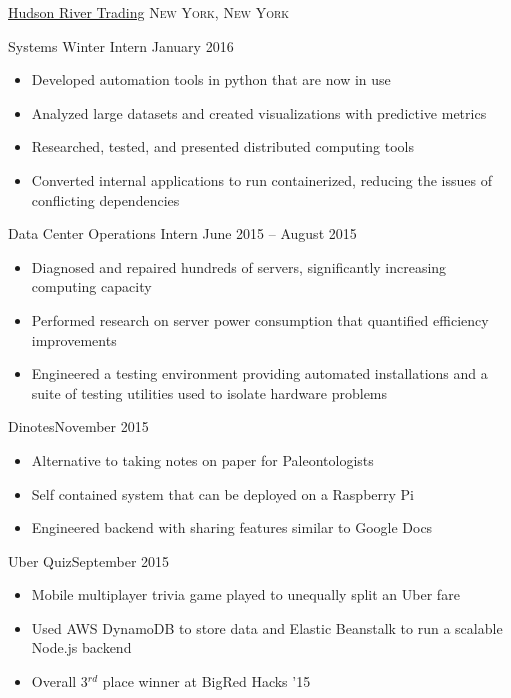 \documentclass[11pt]{article}
\begin{document}
\headedsection  %
{\href{http://www.hudson-trading.com/}{Hudson River Trading}}
{\textsc{New York, New York}} {
    \headedsubsection
    {Systems Winter Intern}
    {January 2016}
    {
        \begin{itemize}
            \item Developed automation tools in python that are now in use
            \item Analyzed large datasets and created visualizations with predictive metrics
            \item Researched, tested, and presented distributed computing tools
            \item Converted internal applications to run containerized, reducing the issues of conflicting dependencies
        \end{itemize}
    }
}

\headedsection  %
{}
{} {
    \headedsubsection
    {Data Center Operations Intern}
    {June 2015 -- August 2015}
    {
        \begin{itemize}
            \item Diagnosed and repaired hundreds of servers, significantly increasing computing capacity
            \item Performed research on server power consumption that quantified efficiency improvements
            \item Engineered a testing environment providing automated installations and a suite of testing utilities used to isolate hardware problems
        \end{itemize}
    }
}


\spacedhrule{0.1em}{0.9em}  %

\headedsubsection
{Dinotes}{November 2015}
{
    \begin{itemize}[leftmargin=0.5in]
        \item{Alternative to taking notes on paper for Paleontologists}
        \item{Self contained system that can be deployed on a Raspberry Pi}
        \item{Engineered backend with sharing features similar to Google Docs}
    \end{itemize}
}

\headedsubsection
{Uber Quiz}{September 2015}
{
    \begin{itemize}[leftmargin=0.5in]
        \item{Mobile multiplayer trivia game played to unequally split an Uber fare}
        \item{Used AWS DynamoDB to store data and Elastic Beanstalk to run a scalable Node.js backend}
        \item{Overall 3$^{rd}$ place winner at BigRed Hacks '15}
    \end{itemize}
}
\end{document}
